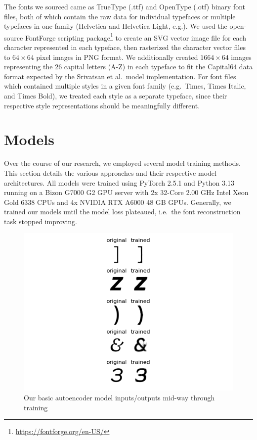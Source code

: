 The fonts we sourced came as TrueType (.ttf) and OpenType (.otf) binary font files, both of which contain the raw data for individual typefaces or multiple typefaces in one family (Helvetica and Helvetica Light, e.g.). We used the open-source FontForge scripting package\footnote{\url{https://fontforge.org/en-US/}} to create an SVG vector image file for each character represented in each typeface, then rasterized the character vector files to $64 \times 64$ pixel images in PNG format. We additionally created $1664 \times 64$ images representing the 26 capital letters (A-Z) in each typeface to fit the Capital64 data format expected by the Srivatsan et al.\ model implementation. For font files which contained multiple styles in a given font family (e.g.\ Times, Times Italic, and Times Bold), we treated each style as a separate typeface, since their respective style representations should be meaningfully different.

\section{Models}

Over the course of our research, we employed several model training methods. This section details the various approaches and their respective model architectures. All models were trained using PyTorch 2.5.1 and Python 3.13 running on a Bizon G7000 G2 GPU server with 2x 32-Core 2.00 GHz Intel Xeon Gold 6338 CPUs and 4x NVIDIA RTX A6000 48 GB GPUs. Generally, we trained our models until the model loss plateaued, i.e.\ the font reconstruction task stopped improving.

\begin{figure}[]
    \centering
    \includegraphics[width=\textwidth]{images/autoencoder-example.png}
    \caption{Our basic autoencoder model inputs/outputs mid-way through training}
    \label{fig:autoencoder-example}
\end{figure}

